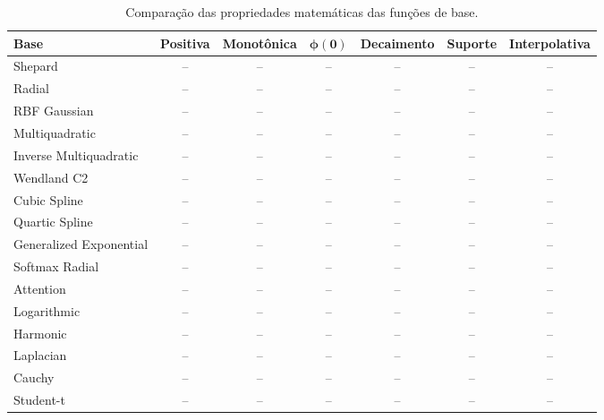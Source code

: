 \documentclass[12pt,a4paper]{article}
\begin{document}
	\begin{table}[H]
		\centering
		\small
		\caption{
			Comparação das propriedades matemáticas das funções de base.
		}
		\label{tab:comparacao-bases}
		\begin{tabular}{lcccccc}
			\toprule
			\textbf{Base}
			&
			\textbf{Positiva}
			&
			\textbf{Monotônica}
			&
			$\boldsymbol{\phi(0)}$
			&
			\textbf{Decaimento}
			&
			\textbf{Suporte}
			&
			\textbf{Interpolativa}
			\\
			\midrule
			
			Shepard
			& -- & -- & -- & -- & -- & -- \\
			
			Radial
			& -- & -- & -- & -- & -- & -- \\
			
			RBF Gaussian
			& -- & -- & -- & -- & -- & -- \\
			
			Multiquadratic
			& -- & -- & -- & -- & -- & -- \\
			
			Inverse Multiquadratic
			& -- & -- & -- & -- & -- & -- \\
			
			Wendland C2
			& -- & -- & -- & -- & -- & -- \\
			
			Cubic Spline
			& -- & -- & -- & -- & -- & -- \\
			
			Quartic Spline
			& -- & -- & -- & -- & -- & -- \\
			
			Generalized Exponential
			& -- & -- & -- & -- & -- & -- \\
			
			Softmax Radial
			& -- & -- & -- & -- & -- & -- \\
			
			Attention
			& -- & -- & -- & -- & -- & -- \\
			
			Logarithmic
			& -- & -- & -- & -- & -- & -- \\
			
			Harmonic
			& -- & -- & -- & -- & -- & -- \\
			
			Laplacian
			& -- & -- & -- & -- & -- & -- \\
			
			Cauchy
			& -- & -- & -- & -- & -- & -- \\
			
			Student-t
			& -- & -- & -- & -- & -- & -- \\
			

\end{tabular}
\end{table}
\end{document}
